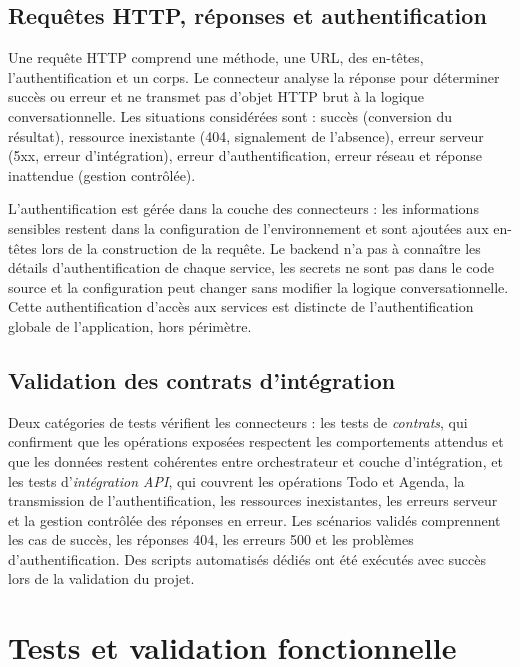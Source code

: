 \documentclass[11pt,a4paper,openany,oneside]{report}
\begin{document}
\subsection{Requêtes HTTP, réponses et authentification}
Une requête HTTP comprend une méthode, une URL, des en-têtes, l'authentification et un corps. Le connecteur analyse la réponse pour déterminer succès ou erreur et ne transmet pas d'objet HTTP brut à la logique conversationnelle. Les situations considérées sont : succès (conversion du résultat), ressource inexistante (404, signalement de l'absence), erreur serveur (5xx, erreur d'intégration), erreur d'authentification, erreur réseau et réponse inattendue (gestion contrôlée).

L'authentification est gérée dans la couche des connecteurs : les informations sensibles restent dans la configuration de l'environnement et sont ajoutées aux en-têtes lors de la construction de la requête. Le backend n'a pas à connaître les détails d'authentification de chaque service, les secrets ne sont pas dans le code source et la configuration peut changer sans modifier la logique conversationnelle. Cette authentification d'accès aux services est distincte de l'authentification globale de l'application, hors périmètre.

\subsection{Validation des contrats d'intégration}
Deux catégories de tests vérifient les connecteurs : les tests de \emph{contrats}, qui confirment que les opérations exposées respectent les comportements attendus et que les données restent cohérentes entre orchestrateur et couche d'intégration, et les tests d'\emph{intégration API}, qui couvrent les opérations Todo et Agenda, la transmission de l'authentification, les ressources inexistantes, les erreurs serveur et la gestion contrôlée des réponses en erreur. Les scénarios validés comprennent les cas de succès, les réponses 404, les erreurs 500 et les problèmes d'authentification. Des scripts automatisés dédiés ont été exécutés avec succès lors de la validation du projet.

\section{Tests et validation fonctionnelle}
\end{document}
